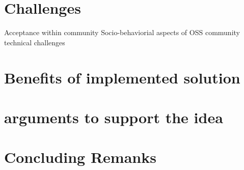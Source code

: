 \section{Challenges}
Acceptance within community
Socio-behaviorial aspects of OSS community
technical challenges
\section{Benefits of implemented solution}
\section{arguments to support the idea}
\section{Concluding Remanks} 	
